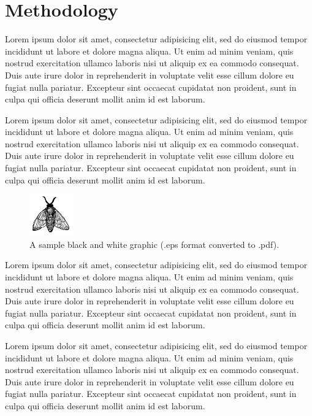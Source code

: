 %
%
%
%

\chapter{Methodology}

Lorem ipsum dolor sit amet, consectetur adipisicing elit, sed do eiusmod tempor incididunt ut labore et dolore magna aliqua. Ut enim ad minim veniam, quis nostrud exercitation ullamco laboris nisi ut aliquip ex ea commodo consequat. Duis aute irure dolor in reprehenderit in voluptate velit esse cillum dolore eu fugiat nulla pariatur. Excepteur sint occaecat cupidatat non proident, sunt in culpa qui officia deserunt mollit anim id est laborum.

Lorem ipsum dolor sit amet, consectetur adipisicing elit, sed do eiusmod tempor incididunt ut labore et dolore magna aliqua. Ut enim ad minim veniam, quis nostrud exercitation ullamco laboris nisi ut aliquip ex ea commodo consequat. Duis aute irure dolor in reprehenderit in voluptate velit esse cillum dolore eu fugiat nulla pariatur. Excepteur sint occaecat cupidatat non proident, sunt in culpa qui officia deserunt mollit anim id est laborum.

\begin{figure}
\centering
\includegraphics{images/fly}
\caption{A sample black and white graphic (.eps format converted to .pdf).}
\end{figure}

Lorem ipsum dolor sit amet, consectetur adipisicing elit, sed do eiusmod tempor incididunt ut labore et dolore magna aliqua. Ut enim ad minim veniam, quis nostrud exercitation ullamco laboris nisi ut aliquip ex ea commodo consequat. Duis aute irure dolor in reprehenderit in voluptate velit esse cillum dolore eu fugiat nulla pariatur. Excepteur sint occaecat cupidatat non proident, sunt in culpa qui officia deserunt mollit anim id est laborum.

Lorem ipsum dolor sit amet, consectetur adipisicing elit, sed do eiusmod tempor incididunt ut labore et dolore magna aliqua. Ut enim ad minim veniam, quis nostrud exercitation ullamco laboris nisi ut aliquip ex ea commodo consequat. Duis aute irure dolor in reprehenderit in voluptate velit esse cillum dolore eu fugiat nulla pariatur. Excepteur sint occaecat cupidatat non proident, sunt in culpa qui officia deserunt mollit anim id est laborum.

